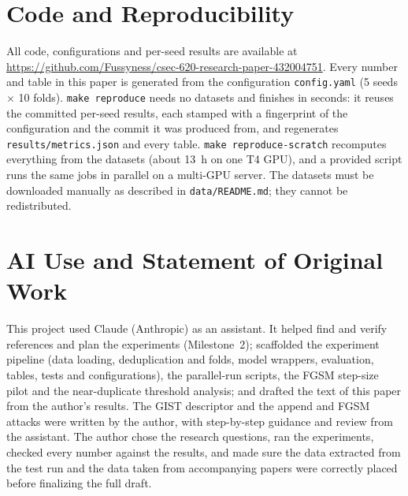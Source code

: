 \documentclass[conference]{IEEEtran}
\begin{document}



\appendices
\section{Code and Reproducibility}\label{app:repro}
All code, configurations and per-seed results are available at
\url{https://github.com/Fussyness/csec-620-research-paper-432004751}. Every number and table in this paper is
generated from the configuration \texttt{config.yaml} (5 seeds $\times$ 10 folds).
\texttt{make reproduce} needs no datasets and finishes in seconds: it reuses the
committed per-seed results, each stamped with a fingerprint of the configuration and
the commit it was produced from, and regenerates \texttt{results/metrics.json} and
every table. \texttt{make reproduce-scratch} recomputes everything from the datasets
(about 13~h on one T4 GPU), and a provided script runs the same jobs in parallel on a
multi-GPU server. The datasets must be downloaded manually as described in
\texttt{data/README.md}; they cannot be redistributed.

\section{AI Use and Statement of Original Work}
This project used Claude (Anthropic) as an assistant. It helped find and verify
references and plan the experiments (Milestone~2); scaffolded the experiment
pipeline (data loading, deduplication and folds, model wrappers, evaluation, tables,
tests and configurations), the parallel-run scripts, the FGSM step-size pilot and the
near-duplicate threshold analysis; and drafted the text of this paper from the
author's results. The GIST descriptor and the append and FGSM attacks were written by
the author, with step-by-step guidance and review from the assistant. The author
chose the research questions, ran the experiments, checked every number against the
results, and made sure the data extracted from the test run and the data taken from accompanying papers were correctly placed before finalizing the full draft.
\end{document}
